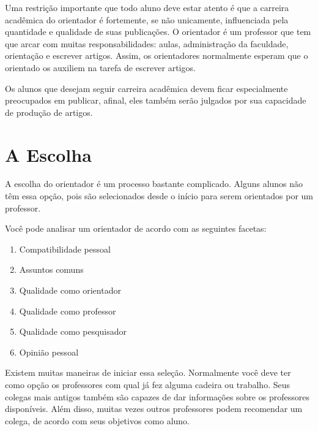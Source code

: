 Uma restrição importante que todo aluno deve estar atento é que a carreira acadêmica do orientador é fortemente, se não unicamente, influenciada pela quantidade e qualidade de suas publicações. 
O orientador é um professor que tem que arcar com muitas responsabilidades: aulas, administração da faculdade, orientação e escrever artigos. 
Assim, os orientadores normalmente esperam que o orientado os auxiliem na tarefa de escrever artigos. 


Os alunos que desejam seguir carreira acadêmica devem ficar especialmente preocupados em publicar, afinal, eles também serão julgados por sua capacidade de produção de artigos.




\section{A Escolha}


A escolha do orientador é um processo bastante complicado. Alguns alunos não têm essa opção, pois são selecionados desde o início para serem orientados por um professor. 


Você pode analisar um orientador de acordo com as seguintes facetas:

\begin{enumerate}
	\item 	Compatibilidade pessoal


	\item 	Assuntos comuns


	\item 	Qualidade como orientador


	\item 	Qualidade como professor


	\item 	Qualidade como pesquisador


	\item 	Opinião pessoal

\end{enumerate}

Existem muitas maneiras de iniciar essa seleção. Normalmente você deve ter como opção os professores com qual já fez alguma cadeira ou trabalho. Seus colegas mais antigos também são capazes de dar informações sobre os professores disponíveis. Além disso, muitas vezes outros professores podem recomendar um colega, de acordo com seus objetivos como aluno.


